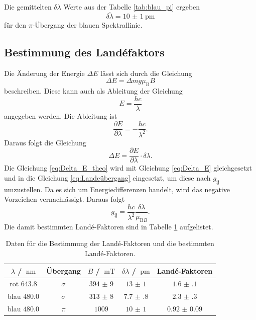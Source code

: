 \FloatBarrier
Die gemittelten $\delta \lambda$ Werte aus der Tabelle \ref{tab:blau_pi} ergeben 
\begin{equation*}
    \overline{\delta\lambda} = \SI{10(1)}{\pico\meter}
\end{equation*}
für den $\pi$-Übergang der blauen Spektrallinie.
\subsection{Bestimmung des Landéfaktors}
Die Änderung der Energie $\Delta E$ lässt sich durch die Gleichung 
\begin{equation}
    \label{eq:Delta_E_theo}
    \Delta E = \Delta mg\mu_{\text{B}}B
\end{equation}
beschreiben. 
Diese kann auch als Ableitung der Gleichung
\begin{equation*}
    E = \frac{hc}{\lambda}
\end{equation*}
angegeben werden. 
Die Ableitung ist 
\begin{equation*}
    \frac{\partial E}{\partial \lambda}=-\frac{hc}{\lambda^2}.
\end{equation*}
Daraus folgt die Gleichung 
\begin{equation}
    \label{eq:Delta_E}
    \Delta E =\frac{\partial E}{\partial \lambda}\cdot \delta\lambda.
\end{equation}
Die Gleichung \eqref{eq:Delta_E_theo} wird mit Gleichung \eqref{eq:Delta_E} gleichgesetzt und in die Gleichung \eqref{eq:Landeübergang} eingesetzt, um diese nach $g_{\text{ij}}$ umzustellen. Da es sich um 
Energiedifferenzen handelt, wird das negative Vorzeichen vernachlässigt.
Daraus folgt
\begin{equation}
    \label{eq:g_Bestimmung}
    g_{\text{ij}}=\frac{hc}{\lambda^2}\frac{\delta \lambda}{\mu_{\text{B}B}}.
\end{equation}
Die damit bestimmten Landé-Faktoren sind in Tabelle \ref{tab:exp_lande} aufgelistet.
\FloatBarrier
\begin{table}
    \centering
    \caption{Daten für die Bestimmung der Landé-Faktoren und die bestimmten Landé-Faktoren.}
    \label{tab:exp_lande}
    \begin{tabular}{c c c c c}
        \toprule
        $\lambda$ / $\SI{}{\nano\meter}$&Übergang&$B$ / $\SI{}{\milli\tesla}$&$\delta \lambda$ / $\SI{}{\pico\meter}$&Landé-Faktoren\\
        \midrule
        rot $\num{643.8}$ &$\sigma$ &$\num{394(9)}$ &$\num{13(1)}$  &$\num{1.6(1)}$\\
        blau $\num{480.0}$&$\sigma$ &$\num{313(8)}$ &$\num{7.7(8)}$ &$\num{2.3(3)}$\\
        blau $\num{480.0}$&$\pi$    &$\num{1009}$   &$\num{10(1)}$  &$\num{0.92(9)}$\\
        \bottomrule
    \end{tabular}
\end{table}



